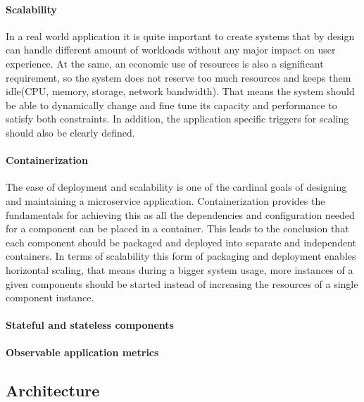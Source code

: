\paragraph{Scalability}In a real world application it is quite important to create systems that by design can handle different amount of workloads without any major impact on user experience. At the same, an economic use of resources is also a significant requirement, so the system does not reserve too much resources and keeps them idle(\eg CPU, memory, storage, network bandwidth). That means the system should be able to dynamically change and fine tune its capacity and performance to satisfy both constraints. In addition, the application specific triggers for scaling should also be clearly defined.

\paragraph{Containerization}The ease of deployment and scalability is one of the cardinal goals of designing and maintaining a microservice application. Containerization provides the fundamentals for achieving this as all the dependencies and configuration needed for a component can be placed in a container. This leads to the conclusion that each component should be packaged and deployed into separate and independent containers.  In terms of scalability this form of packaging and deployment enables horizontal scaling, that means \eg during a bigger system usage, more instances of a given components should be started instead of increasing the resources of a single component instance.

\paragraph{Stateful and stateless components}

\paragraph{Observable application metrics}



\subsection{Architecture}

